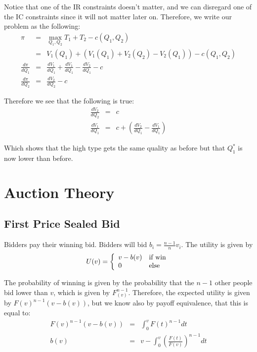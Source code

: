 \documentclass[12pt]{article}
\begin{document}
Notice that one of the IR constraints doesn't matter, and we can disregard one of the IC constraints since it will not matter later on. Therefore, we write our problem as the following:
\begin{eqnarray}
\pi &=& \max_{Q_1, Q_2} T_1 + T_2 - c(Q_1, Q_2) \\ 
 &=& V_1(Q_1) + (V_1(Q_1) + V_2(Q_2) - V_2(Q_1)) - c(Q_1, Q_2) \\
\frac{d \pi}{d Q_1} &=& \frac{d V_1}{d Q_1} + \frac{d V_1}{d Q_1} - \frac{d V_2}{d Q_1} - c \\
\frac{d \pi}{d Q_2} &=& \frac{d V_2}{d Q_2} - c 
\end{eqnarray}

Therefore we see that the following is true:
\begin{eqnarray}
\frac{d V_2}{d Q_2} &=& c \\
\frac{d V_1}{d Q_1} &=& c + \left( \frac{d V_2}{d Q_1} - \frac{d V_1}{d Q_1} \right)
\end{eqnarray}

Which shows that the high type gets the same quality as before but that $Q_1^*$ is now lower than before. 

\section{Auction Theory}

\subsection{First Price Sealed Bid}

Bidders pay their winning bid. Bidders will bid $b_i = \frac{n-1}{n} v_i$. The utility is given by 
\begin{eqnarray}
U(v) = \left\{ \begin{array}{l l}
v - b(v) & \text{if win} \\
0 & \text{else}
\end{array}\right.
\end{eqnarray}

The probability of winning is given by the probability that the $n-1$ other people bid lower than $v$, which is given by $F_(v)^{n-1}$. Therefore, the expected utility is given by $F(v)^{n-1} (v - b(v))$, but we know also by payoff equivalence, that this is equal to:
\begin{eqnarray}
F(v)^{n-1} (v - b(v)) &=& \int_0^v F(t)^{n-1} dt \\
b(v) &=& v - \int_0^v \left( \frac{F(t)}{F(v)} \right)^{n-1} dt 
\end{eqnarray}
\end{document}
